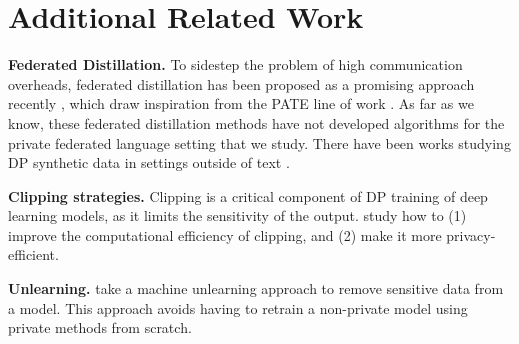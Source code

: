 \documentclass{article}
\theoremstyle{plain}
\theoremstyle{definition}
\theoremstyle{remark}
\begin{document}
\printAffiliationsAndNotice{} %

\begin{abstract}

\end{abstract}














\newpage
\appendix
\onecolumn
\section{Additional Related Work}

\textbf{Federated Distillation.} To sidestep the problem of high communication overheads, federated distillation has been proposed as a promising approach recently \citep{NEURIPS2020_fef6f971, Abourayya2023LittleIE, Wang_2023_CVPR, Wu2021CommunicationefficientFL, NEURIPS2020_18df51b9, Cho2021PersonalizedFL}, which draw inspiration from the PATE line of work \citep{Papernot2016SemisupervisedKT, Papernot2018ScalablePL}. As far as we know, these federated distillation methods have not developed algorithms for the private federated language setting that we study. There have been works studying DP synthetic data in settings outside of text \citep{Torkzadehmahani_2019_CVPR_Workshops, Neunhoeffer2020PrivatePB}.


\textbf{Clipping strategies.} Clipping is a critical component of DP training of deep learning models, as it limits the sensitivity of the output. \citet{li2021large,bu2024automatic, bu2023differentially, kong2024unified} study how to (1) improve the computational efficiency of clipping, and (2) make it more privacy-efficient.

\textbf{Unlearning.} \citet{chen2023unlearn, jang2022knowledge, kumar2022privacy, yao2024machine} take a machine unlearning approach to remove sensitive data from a model. This approach avoids having to retrain a non-private model using private methods from scratch.
\end{document}
